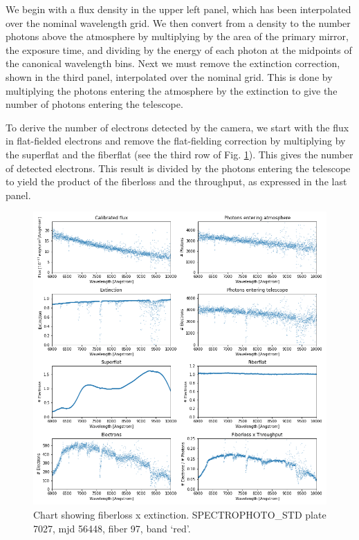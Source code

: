 We begin with a flux density in the upper left panel, which has been interpolated over the nominal wavelength grid. We then convert from a density to the number photons above the atmosphere by multiplying by the area of the primary mirror, the exposure time, and dividing by the energy of each photon at the midpoints of the canonical wavelength bins. Next we must remove the extinction correction, shown in the third panel, interpolated over the nominal grid. This is done by multiplying the photons entering the atmosphere by the extinction to give the number of photons entering the telescope. 

To derive the number of electrons detected by the camera, we start with the flux in flat-fielded electrons and remove the flat-fielding correction by multiplying by the superflat and the fiberflat (see the third row of Fig. \ref{fig:fiberloss_chart}). This gives the number of detected electrons. This result is divided by the photons entering the telescope to yield the product of the fiberloss and the throughput, as expressed in the last panel.

\begin{figure}[h]
\centering
\includegraphics[width=14cm]{images/specsim/fiberloss_chart_red.png}
\caption{Chart showing fiberloss x extinction. SPECTROPHOTO\_STD plate 7027, mjd 56448, fiber 97, band `red'.}
\label{fig:fiberloss_chart}
\end{figure}

